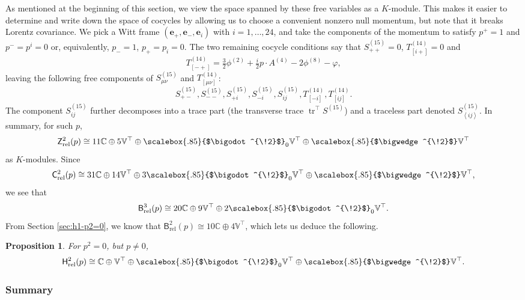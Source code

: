 \documentclass[11pt,reqno,a4paper,final]{amsart}
\newcommand\ext[1]{\scalebox{.85}{$\bigwedge^{\!#1}$}}
\newcommand\sym[1]{\scalebox{.85}{$\bigodot^{\!#1}$}}
\theoremstyle{plain}
\newtheorem{proposition}[lemma]{Proposition}
\theoremstyle{definition}
\newcommand{\be}{\boldsymbol{e}}
\newcommand{\Crel}{\mathsf{C}_{\mathrm{rel}}} %
\newcommand{\Hrel}{\mathsf{H}_{\mathrm{rel}}}
\newcommand{\Brel}{\mathsf{B}_{\mathrm{rel}}}
\newcommand{\Zrel}{\mathsf{Z}_{\mathrm{rel}}}
\newcommand{\tr}{\operatorname{tr}}
\newcommand{\VV}{\mathbb{V}}
\newcommand{\CC}{\mathbb{C}}
\newcommand{\1}{\mathbb{1}}
\numberwithin{equation}{section}
\begin{document}
As mentioned at the beginning of this section, we view the space spanned by these free variables as a $K$-module. This makes it easier to determine and write down the space of cocycles by allowing us to choose a convenient
nonzero null momentum, but note that it breaks Lorentz covariance. We pick a Witt frame $(\be_+,\be_-,\be_i)$ with
$i=1,\dots,24$, and take the components of the momentum to satisfy
$p^+ = 1$ and $p^- = p^i = 0$ or, equivalently, $p_- = 1$, $p_+ = p_i
= 0$.  The two remaining cocycle conditions say that $S_{++}^{(15)}=0$,
$T_{[i+]}^{(14)} = 0$ and 
\begin{equation}
  T_{[-+]}^{(14)} = \tfrac32 \phi^{(2)} + \tfrac{i}2 p \cdot A^{(4)} - 2 \phi^{(8)} - \varphi,
\end{equation}
leaving the following free components of $S^{(15)}_{\mu\nu}$ and
$T^{(14)}_{[\mu\nu]}$:
\begin{equation}
  S^{(15)}_{+-},   S^{(15)}_{--},   S^{(15)}_{+i},   S^{(15)}_{-i},
  S^{(15)}_{ij}, T_{[-i]}^{(14)}, T^{(14)}_{[ij]}.
\end{equation}
The component $S^{(15)}_{ij}$ further decomposes into a trace part
(the transverse trace $\tr^\top S^{(15)}$) and a traceless part
denoted $S^{(15)}_{\left<ij\right>}$.  In summary, for such $p$,
\begin{equation}
  \Zrel^2(p) \cong 11 \CC \oplus 5 \VV^\top \oplus \sym{2}_0 \VV^\top \oplus \ext{2} \VV^\top
\end{equation}
as $K$-modules.  Since
\begin{equation}
  \Crel^2(p) \cong 31 \CC \oplus 14 \VV^\top \oplus 3 \sym{2}_0 \VV^\top \oplus \ext{2} \VV^\top,
\end{equation}
we see that
\begin{equation}
  \label{eq:B3rel-p-as-reps}
  \Brel^3(p) \cong 20 \CC \oplus 9 \VV^\top \oplus 2 \sym{2}_0 \VV^\top.
\end{equation}
From Section \ref{sec:h1-p2=0}, we know that $\Brel^2(p) \cong 10 \CC \oplus 4 \VV^\top$, which lets us deduce the
following.

\begin{proposition}\label{prop:Hrel2}
  For $p^2=0$, but $p\neq 0$,
  \begin{equation}
    \Hrel^2(p) \cong \CC \oplus \VV^\top \oplus \sym{2}_0 \VV^\top \oplus \ext{2}  \VV^\top.
  \end{equation}
\end{proposition}

\subsubsection{Summary}
\label{sec:hrel2-summary}
\end{document}
